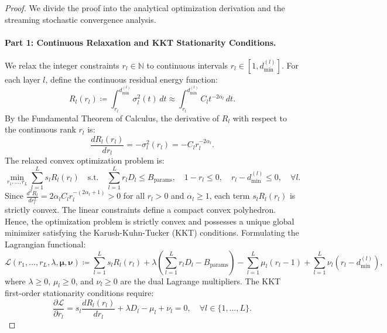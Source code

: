 \begin{proof}
We divide the proof into the analytical optimization derivation and the streaming stochastic convergence analysis.

\paragraph{Part 1: Continuous Relaxation and KKT Stationarity Conditions.}
We relax the integer constraints $r_l \in \mathbb{N}$ to continuous intervals $r_l \in [1, d_{\min}^{(l)}]$.
For each layer $l$, define the continuous residual energy function:
\begin{equation}
R_l(r_l) \coloneqq \int_{r_l}^{d_{\min}^{(l)}} \sigma_l^2(t) \, dt \approx \int_{r_l}^{d_{\min}^{(l)}} C_l t^{-2\alpha_l} \, dt.
\end{equation}
By the Fundamental Theorem of Calculus, the derivative of $R_l$ with respect to the continuous rank $r_l$ is:
\begin{equation}
\frac{d R_l(r_l)}{d r_l} = -\sigma_l^2(r_l) = -C_l r_l^{-2\alpha_l}.
\label{eq:residual_energy_derivative}
\end{equation}
The relaxed convex optimization problem is:
\begin{equation}
\min_{r_1, \dots, r_L} \sum_{l=1}^L s_l R_l(r_l) \quad \text{s.t.} \quad \sum_{l=1}^L r_l D_l \le B_{\text{params}}, \quad 1 - r_l \le 0, \quad r_l - d_{\min}^{(l)} \le 0, \quad \forall l.
\end{equation}
Since $\frac{d^2 R_l}{d r_l^2} = 2\alpha_l C_l r_l^{-(2\alpha_l + 1)} > 0$ for all $r_l > 0$ and $\alpha_l \ge 1$, each term $s_l R_l(r_l)$ is strictly convex. The linear constraints define a compact convex polyhedron. Hence, the optimization problem is strictly convex and possesses a unique global minimizer satisfying the Karush-Kuhn-Tucker (KKT) conditions.
Formulating the Lagrangian functional:
\begin{equation}
\mathcal{L}(r_1, \dots, r_L, \lambda, \bm{\mu}, \bm{\nu}) \coloneqq \sum_{l=1}^L s_l R_l(r_l) + \lambda \left( \sum_{l=1}^L r_l D_l - B_{\text{params}} \right) - \sum_{l=1}^L \mu_l (r_l - 1) + \sum_{l=1}^L \nu_l (r_l - d_{\min}^{(l)}),
\end{equation}
where $\lambda \ge 0$, $\mu_l \ge 0$, and $\nu_l \ge 0$ are the dual Lagrange multipliers.
The KKT first-order stationarity conditions require:
\begin{equation}
\frac{\partial \mathcal{L}}{\partial r_l} = s_l \frac{d R_l(r_l)}{d r_l} + \lambda D_l - \mu_l + \nu_l = 0, \quad \forall l \in \{1, \dots, L\}.

\end{equation}
\end{proof}
